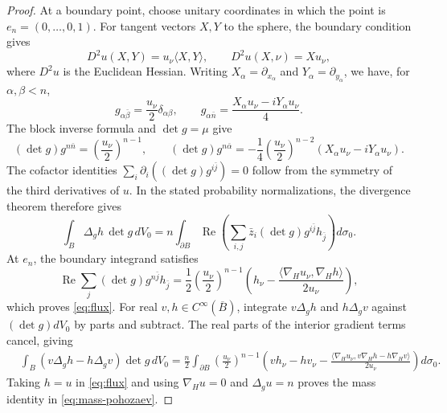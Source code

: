 \documentclass[11pt]{article}
\begin{document}
\begin{proof}
At a boundary point, choose unitary coordinates in which the point
is $e_n=(0,\ldots,0,1)$. For tangent vectors $X,Y$ to the sphere, the boundary
condition gives
$$
 D^2u(X,Y)=u_\nu\langle X,Y\rangle,\qquad
 D^2u(X,\nu)=Xu_\nu,
$$
where $D^2u$ is the Euclidean Hessian. Writing
$X_\alpha=\partial_{x_\alpha}$ and
$Y_\alpha=\partial_{y_\alpha}$, we have, for $\alpha,\beta<n$,
$$
 g_{\alpha\bar\beta}=\frac{u_\nu}{2}\delta_{\alpha\beta},\qquad
 g_{\alpha\bar n}=
 \frac{X_\alpha u_\nu-iY_\alpha u_\nu}{4}.
$$
The block inverse formula and $\det g=\mu$ give
$$
 (\det g)g^{n\bar n}=\left(\frac{u_\nu}{2}\right)^{n-1},\qquad
 (\det g)g^{n\bar\alpha}=
 -\frac14\left(\frac{u_\nu}{2}\right)^{n-2}
 (X_\alpha u_\nu-iY_\alpha u_\nu).
$$
The cofactor identities
$\sum_i\partial_i((\det g)g^{i\bar j})=0$ follow from the symmetry
of the third derivatives of $u$. In the stated probability
normalizations, the divergence theorem therefore gives
$$
 \int_B\Delta_gh\,\det g\,dV_0
 =n\int_{\partial B}\operatorname{Re}
 \left(\sum_{i,j}\bar z_i(\det g)g^{i\bar j}h_{\bar j}\right)d\sigma_0.
$$
At $e_n$, the boundary integrand satisfies
$$
 \operatorname{Re}\sum_j(\det g)g^{n\bar j}h_{\bar j}
 =\frac12\left(\frac{u_\nu}{2}\right)^{n-1}
 \left(h_\nu-
 \frac{\langle\nabla_Hu_\nu,\nabla_Hh\rangle}{2u_\nu}\right),
$$
which proves \eqref{eq:flux}. For real
$v,h\in C^\infty(\overline B)$, integrate $v\Delta_gh$ and
$h\Delta_gv$ against $(\det g)dV_0$ by parts and subtract.
The real parts of the interior gradient terms cancel, giving
\begin{align*}
 &\int_B(v\Delta_gh-h\Delta_gv)\det g\,dV_0=\frac n2\int_{\partial B}\left(\frac{u_\nu}{2}\right)^{n-1}
 \left(vh_\nu-hv_\nu-
 \frac{\langle\nabla_Hu_\nu,v\nabla_Hh-h\nabla_Hv\rangle}
 {2u_\nu}\right)d\sigma_0.
\end{align*}
Taking $h=u$ in \eqref{eq:flux} and using $\nabla_Hu=0$ and
$\Delta_gu=n$ proves the mass identity in
\eqref{eq:mass-pohozaev}.


\end{proof}
\end{document}
